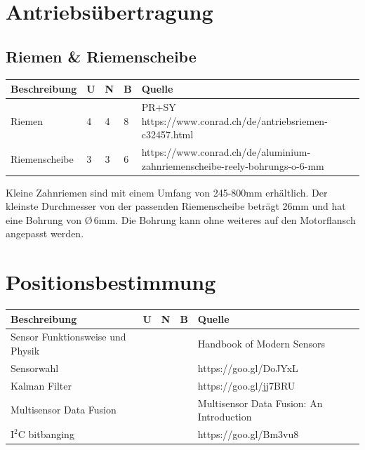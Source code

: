 \documentclass[a4paper]{report}
\begin{document}
\section{Antriebsübertragung}
	\subsection{Riemen \& Riemenscheibe}
		\begin{tabular}{|p{}|p{}|p{}|p{}|p{}|}
		\hline
		\textbf{Beschreibung} & \textbf{U} & \textbf{N} & \textbf{B} & \textbf{Quelle} \\
		\hline
		Riemen &4 &4 &8 & PR+SY
		\newline https://www.conrad.ch/de/antriebsriemen-c32457.html \\
		\hline
		Riemenscheibe &3 &3 &6 &https://www.conrad.ch/de/aluminium-zahnriemenscheibe-reely-bohrungs-o-6-mm \\
		\hline
	\end{tabular}


		Kleine Zahnriemen sind mit einem Umfang von 245-800mm erhältlich. Der kleinste Durchmesser von der passenden Riemenscheibe beträgt 26mm und hat eine Bohrung von \O \,6mm. Die Bohrung kann ohne weiteres auf den Motorflansch angepasst werden.

\section{Positionsbestimmung}

\vspace{1em}
\noindent
\begin{tabular}{|p{}|p{}|p{}|p{}|p{}|}
	\hline
	\textbf{Beschreibung} & \textbf{U} & \textbf{N} & \textbf{B} & \textbf{Quelle} \\
	\hline
	Sensor Funktionsweise und Physik & & & & Handbook of Modern Sensors \\
	\hline
	Sensorwahl & & & & https://goo.gl/DoJYxL \\
	\hline
	Kalman Filter & & & & https://goo.gl/jj7BRU \\
	\hline
	Multisensor Data Fusion & & & & Multisensor Data Fusion: An Introduction \\
	\hline
	$\text{I}^2\text{C}$ bitbanging & & & & https://goo.gl/Bm3vu8 \\
	\hline
\end{tabular}
\end{document}
